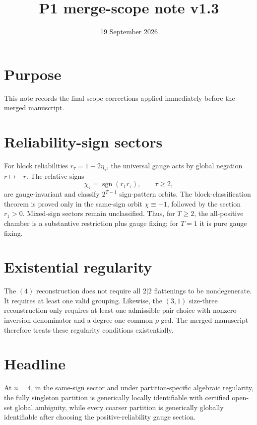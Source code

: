 \documentclass[11pt]{article}
\title{P1 merge-scope note v1.3}
\date{19 September 2026}
\begin{document}
\maketitle
\section*{Purpose}
This note records the final scope corrections applied immediately before the merged manuscript.

\section*{Reliability-sign sectors}
For block reliabilities $r_\tau=1-2\eta_\tau$, the universal gauge acts by global negation
$r\mapsto-r$.  The relative signs
\[
\chi_\tau=\operatorname{sgn}(r_1r_\tau),\qquad \tau\ge2,
\]
are gauge-invariant and classify $2^{T-1}$ sign-pattern orbits.  The block-classification theorem is proved only in the same-sign orbit $\chi\equiv+1$, followed by the section $r_1>0$.  Mixed-sign sectors remain unclassified.  Thus, for $T\ge2$, the all-positive chamber is a substantive restriction plus gauge fixing; for $T=1$ it is pure gauge fixing.

\section*{Existential regularity}
The $(4)$ reconstruction does not require all $2|2$ flattenings to be nondegenerate.  It requires at least one valid grouping.  Likewise, the $(3,1)$ size-three reconstruction only requires at least one admissible pair choice with nonzero inversion denominator and a degree-one common-$\rho$ gcd.  The merged manuscript therefore treats these regularity conditions existentially.

\section*{Headline}
At $n=4$, in the same-sign sector and under partition-specific algebraic regularity, the fully singleton partition is generically locally identifiable with certified open-set global ambiguity, while every coarser partition is generically globally identifiable after choosing the positive-reliability gauge section.
\end{document}
